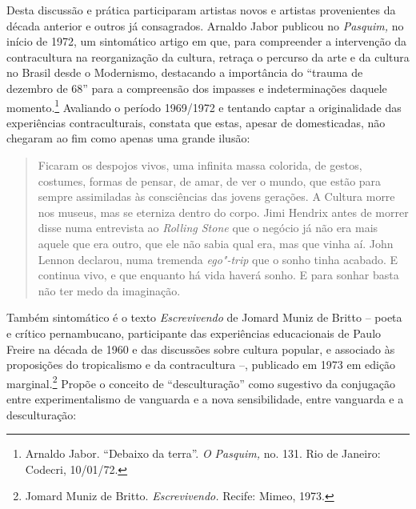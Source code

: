 Desta discussão e prática participaram artistas novos e artistas
provenientes da década anterior e outros já consagrados. Arnaldo Jabor
publicou no \emph{Pasquim,} no início de 1972, um sintomático artigo em
que, para compreender a intervenção da contracultura na reorganização da
cultura, retraça o percurso da arte e da cultura no Brasil desde o
Modernismo, destacando a importância do ``trauma de dezembro de 68''
para a compreensão dos impasses e indeterminações daquele
momento.\footnote{Arnaldo Jabor. ``Debaixo da terra''. \emph{O Pasquim,}
  no. 131. Rio de Janeiro: Codecri, 10/01/72.} Avaliando o período
1969/1972 e tentando captar a originalidade das experiências
contraculturais, constata que estas, apesar de domesticadas, não
chegaram ao fim como apenas uma grande ilusão:

\begin{quote}
Ficaram os despojos vivos, uma infinita massa colorida, de gestos,
costumes, formas de pensar, de amar, de ver o mundo, que estão para
sempre assimiladas às consciências das jovens gerações. A Cultura morre
nos museus, mas se eterniza dentro do corpo. Jimi Hendrix antes de
morrer disse numa entrevista ao \emph{Rolling Stone} que o negócio já
não era mais aquele que era outro, que ele não sabia qual era, mas que
vinha aí. John Lennon declarou, numa tremenda \emph{ego"-trip} que o
sonho tinha acabado. E continua vivo, e que enquanto há vida haverá
sonho. E para sonhar basta não ter medo da imaginação.
\end{quote}

Também sintomático é o texto \emph{Escrevivendo} de Jomard Muniz de
Britto -- poeta e crítico pernambucano, participante das experiências
educacionais de Paulo Freire na década de 1960 e das discussões sobre
cultura popular, e associado às proposições do tropicalismo e da
contracultura --, publicado em 1973 em edição marginal.\footnote{Jomard
  Muniz de Britto. \emph{Escrevivendo.} Recife: Mimeo, 1973.} Propõe o
conceito de ``desculturação'' como sugestivo da conjugação entre
experimentalismo de vanguarda e a nova sensibilidade, entre vanguarda e
a desculturação:

